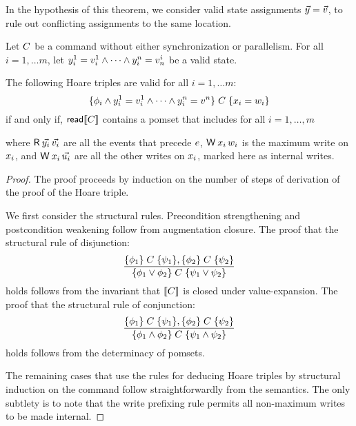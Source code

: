 In the hypothesis of this theorem, we consider valid state assignments $\vec{y} =\vec{v}$, to rule out conflicting assignments to the same location.  
\begin{theorem}\label{hoareGen}
Let $C$ be a command without either synchronization or parallelism.   For all $i=1, \ldots m$, let $y^1_i=v^1_i\land\cdots\land y^n_i=v^i_n$ be a valid state. 

The following Hoare triples are valid for all $i=1, \ldots m$:
\begin{displaymath}
  \{\phi_i\land y^1_i=v^1_i\land\cdots\land y^n_i=v^n\}\allowbreak\;C\;\allowbreak\{x_i=w_i\}  
\end{displaymath}
if and only if, ${\mathsf{read}}\llbracket C\rrbracket$ contains a pomset  that includes for all $i=1, \ldots, m$
\begin{tikzdisplay}[node distance=1em]
\end{tikzdisplay}
where $\DR{\vec{\bLoc_i}}{\vec{\aVal_i}}$ are all the events that precede $e$, $\DW{\aLoc_i}{\bVal_i}$ is the maximum write on $x_i$,  and
$\DW{\aLoc_i}{\vec{\dVal_i}}$ are all the other writes on $x_i$, marked here as internal writes.
\begin{proof}
The proof proceeds by induction on the number of steps of derivation of the proof of the Hoare triple.  

We first consider the structural rules.  Precondition strengthening and postcondition weakening follow from augmentation closure.    
The proof that the structural rule of disjunction:
\[ \frac{\{\phi_1\}\allowbreak\;C\;\allowbreak\{\psi_1\},  \{\phi_2\}\allowbreak\;C\;\allowbreak\{\psi_2\}}{ \{\phi_1 \lor \phi_2\}\allowbreak\;C\;\allowbreak\{\psi_1\lor \psi_2\}} 
\]
holds  follows from the invariant that  $\llbracket C\rrbracket$ is closed under value-expansion.    The proof that the structural rule of conjunction:
\[ \frac{\{\phi_1\}\allowbreak\;C\;\allowbreak\{\psi_1\},  \{\phi_2\}\allowbreak\;C\;\allowbreak\{\psi_2\}}{ \{\phi_1 \land \phi_2\}\allowbreak\;C\;\allowbreak\{\psi_1\land \psi_2\}} 
\]
holds follows from the determinacy of pomsets.  

The remaining cases that use the rules for deducing Hoare triples by structural induction on the command follow straightforwardly from the semantics.    The only subtlety is to note that the write prefixing rule permits all non-maximum writes to be made internal.   
\end{proof}
\end{theorem}



